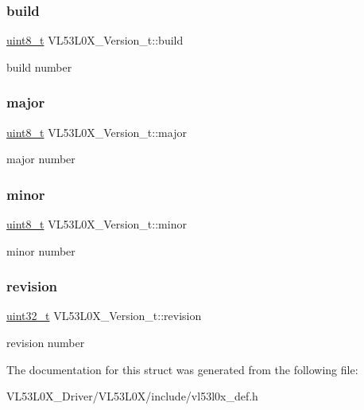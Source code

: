 \subsubsection{\texorpdfstring{build}{build}}
{\footnotesize\ttfamily \hyperlink{vl53l0x__types_8h_aba7bc1797add20fe3efdf37ced1182c5}{uint8\+\_\+t} V\+L53\+L0\+X\+\_\+\+Version\+\_\+t\+::build}

build number \mbox{\label{structVL53L0X__Version__t_ab11a400c567bc52f47ed13c23a535b06}} 
\subsubsection{\texorpdfstring{major}{major}}
{\footnotesize\ttfamily \hyperlink{vl53l0x__types_8h_aba7bc1797add20fe3efdf37ced1182c5}{uint8\+\_\+t} V\+L53\+L0\+X\+\_\+\+Version\+\_\+t\+::major}

major number \mbox{\label{structVL53L0X__Version__t_a0ae0926fe003ade5547da0483447d99b}} 
\subsubsection{\texorpdfstring{minor}{minor}}
{\footnotesize\ttfamily \hyperlink{vl53l0x__types_8h_aba7bc1797add20fe3efdf37ced1182c5}{uint8\+\_\+t} V\+L53\+L0\+X\+\_\+\+Version\+\_\+t\+::minor}

minor number \mbox{\label{structVL53L0X__Version__t_ab4a7231e7d29bf587f55919438f453a6}} 
\subsubsection{\texorpdfstring{revision}{revision}}
{\footnotesize\ttfamily \hyperlink{vl53l0x__types_8h_a435d1572bf3f880d55459d9805097f62}{uint32\+\_\+t} V\+L53\+L0\+X\+\_\+\+Version\+\_\+t\+::revision}

revision number 

The documentation for this struct was generated from the following file\+:\begin{DoxyCompactItemize}
\item 
V\+L53\+L0\+X\+\_\+\+Driver/\+V\+L53\+L0\+X/include/vl53l0x\+\_\+def.\+h\end{DoxyCompactItemize}
